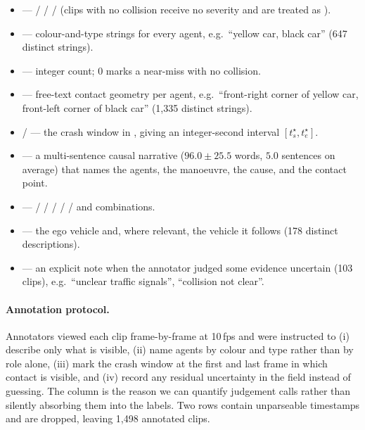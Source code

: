 \begin{itemize}
  \item {} ---  /  /  /  (clips with no collision receive no severity and are treated as ).
  \item {} --- colour-and-type strings for every agent, e.g.\ ``yellow car, black car'' (647 distinct strings).
  \item {} --- integer count; $0$ marks a near-miss with no collision.
  \item {} --- free-text contact geometry per agent, e.g.\ ``front-right corner of yellow car, front-left corner of black car'' (1{,}335 distinct strings).
  \item {} /  --- the crash window in , giving an integer-second interval $[t_s^\star,t_e^\star]$.
  \item {} --- a multi-sentence causal narrative ($96.0\pm25.5$ words, $5.0$ sentences on average) that names the agents, the manoeuvre, the cause, and the contact point.
  \item {} ---  /  /  /  /  /  and combinations.
  \item {} --- the ego vehicle and, where relevant, the vehicle it follows (178 distinct descriptions).
  \item {} --- an explicit note when the annotator judged some evidence uncertain (103 clips), e.g.\ ``unclear traffic signals'', ``collision not clear''.
\end{itemize}

\paragraph{Annotation protocol.}
Annotators viewed each clip frame-by-frame at 10\,fps and were instructed to (i) describe only what is visible, (ii) name agents by colour and type rather than by role alone, (iii) mark the crash window at the first and last frame in which contact is visible, and (iv) record any residual uncertainty in the  field instead of guessing.
The  column is the reason we can quantify judgement calls rather than silently absorbing them into the labels.
Two rows contain unparseable timestamps and are dropped, leaving 1{,}498 annotated clips.

